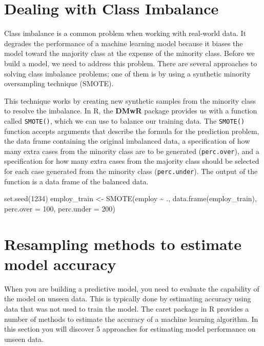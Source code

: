 \documentclass[
]{book}
\newenvironment{Shaded}{\begin{snugshade}}{\end{snugshade}}
\newcommand{\AttributeTok}[1]{\textcolor[rgb]{0.77,0.63,0.00}{#1}}
\newcommand{\DecValTok}[1]{\textcolor[rgb]{0.00,0.00,0.81}{#1}}
\newcommand{\FunctionTok}[1]{\textcolor[rgb]{0.00,0.00,0.00}{#1}}
\newcommand{\NormalTok}[1]{#1}
\newcommand{\OtherTok}[1]{\textcolor[rgb]{0.56,0.35,0.01}{#1}}
\newcommand{\SpecialCharTok}[1]{\textcolor[rgb]{0.00,0.00,0.00}{#1}}
\begin{document}
\hypertarget{dealing-with-class-imbalance}{%
\section{Dealing with Class Imbalance}\label{dealing-with-class-imbalance}}

Class imbalance is a common problem when working with real-world data. It degrades the performance of a machine learning model because it biases the model toward the majority class at the expense of the minority class. Before we build a model, we need to address this problem. There are several approaches to solving class imbalance problems; one of them is by using a synthetic minority oversampling technique (SMOTE).

This technique works by creating new synthetic samples from the minority class to resolve the imbalance. In R, the \textbf{DMwR} package provides us with a function called \texttt{SMOTE()}, which we can use to balance our training data. The \texttt{SMOTE()} function accepts arguments that describe the formula for the prediction problem, the data frame containing the original imbalanced data, a specification of how many extra cases from the minority class are to be generated (\texttt{perc.over}), and a specification for how many extra cases from the majority class should be selected for each case generated from the minority class (\texttt{perc.under}). The output of the function is a data frame of the balanced data.

\begin{Shaded}
\begin{Highlighting}[]
\FunctionTok{set.seed}\NormalTok{(}\DecValTok{1234}\NormalTok{)}
\NormalTok{employ\_train }\OtherTok{\textless{}{-}} \FunctionTok{SMOTE}\NormalTok{(employ }\SpecialCharTok{\textasciitilde{}}\NormalTok{ ., }\FunctionTok{data.frame}\NormalTok{(employ\_train),}
                      \AttributeTok{perc.over =} \DecValTok{100}\NormalTok{, }\AttributeTok{perc.under =} \DecValTok{200}\NormalTok{)}
\end{Highlighting}
\end{Shaded}

\hypertarget{resampling-methods-to-estimate-model-accuracy}{%
\section{Resampling methods to estimate model accuracy}\label{resampling-methods-to-estimate-model-accuracy}}

When you are building a predictive model, you need to evaluate the capability of the model on unseen data. This is typically done by estimating accuracy using data that was not used to train the model. The caret package in R provides a number of methods to estimate the accuracy of a machine learning algorithm. In this section you will discover 5 approaches for estimating model performance on unseen data.
\end{document}
